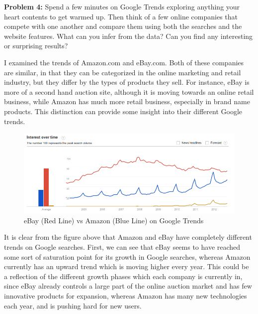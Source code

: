 \documentclass[psamsfonts]{amsart}
\newenvironment{sol}{\vspace{0.25cm}{\large \bfseries Solution:}}{\qedsymbol}
\newenvironment{prob}[1]{\begin{framed}{\large \bfseries Problem #1:}}{\end{framed}}
\begin{document}
\newpage 

\begin{prob}{4}
Spend a few minutes on Google Trends exploring anything your heart contents to get warmed up. Then think of a few online companies that compete with one another and compare them using both the searches and the website features. What can you infer from the data? Can you find any interesting or surprising results?
\end{prob}
\begin{sol}
I examined the trends of Amazon.com and eBay.com. Both of these companies are similar, in that they can be categorized in the online marketing and retail industry, but they differ by the types of products they sell. For instance, eBay is more of a second hand auction site, although it is moving towards an online retail business, while Amazon has much more retail business, especially in brand name products. This distinction can provide some insight into their different Google trends.

\begin{figure}[h!]
\includegraphics[width=6in]{ebay_vs_amazon.png}
\caption{eBay (Red Line) vs Amazon (Blue Line) on Google Trends}
\end{figure}

It is clear from the figure above that Amazon and eBay have completely different trends on Google searches. First, we can see that eBay seems to have reached some sort of saturation point for its growth in Google searches, whereas Amazon currently has an upward trend which is moving higher every year. This could be a reflection of the different growth phases which each company is currently in, since eBay already controls a large part of the online auction market and has few innovative products for expansion, whereas Amazon has many new technologies each year, and is pushing hard for new users. 


\end{sol}
\end{document}

